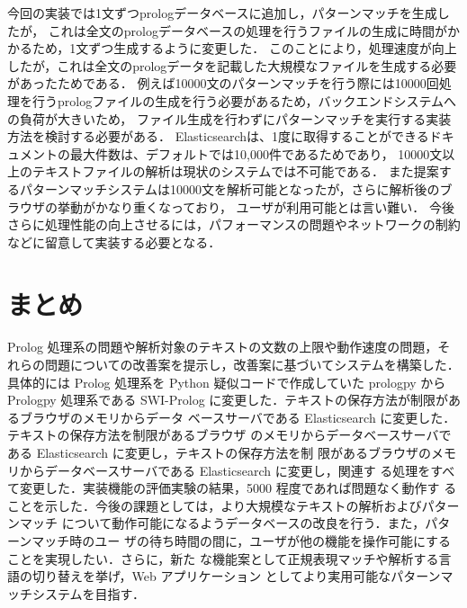 \documentclass{FITpaper}
\begin{document}
  
  今回の実装では1文ずつprologデータベースに追加し，パターンマッチを生成したが，
  これは全文のprologデータベースの処理を行うファイルの生成に時間がかかるため，1文ずつ生成するように変更した．
  このことにより，処理速度が向上したが，これは全文のprologデータを記載した大規模なファイルを生成する必要があったためである．
  例えば10000文のパターンマッチを行う際には10000回処理を行うprologファイルの生成を行う必要があるため，バックエンドシステムへの負荷が大きいため，
  ファイル生成を行わずにパターンマッチを実行する実装方法を検討する必要がある．
  Elasticsearchは、1度に取得することができるドキュメントの最大件数は、デフォルトでは10,000件であるためであり，
  10000文以上のテキストファイルの解析は現状のシステムでは不可能である．
  また提案するパターンマッチシステムは10000文を解析可能となったが，さらに解析後のブラウザの挙動がかなり重くなっており，
  ユーザが利用可能とは言い難い．
  今後さらに処理性能の向上させるには，パフォーマンスの問題やネットワークの制約などに留意して実装する必要となる．
  

\section{まとめ}
Prolog 処理系の問題や解析対象のテキストの文数の上限や動作速度の問題，そ
れらの問題についての改善案を提示し，改善案に基づいてシステムを構築した．具体的には
Prolog 処理系を Python 疑似コードで作成していた prologpy から Prologpy 処理系である
SWI-Prolog に変更した．テキストの保存方法が制限があるブラウザのメモリからデータ
ベースサーバである Elasticsearch に変更した．テキストの保存方法を制限があるブラウザ
のメモリからデータベースサーバである Elasticsearch に変更し，テキストの保存方法を制
限があるブラウザのメモリからデータベースサーバである Elasticsearch に変更し，関連す
る処理をすべて変更した．実装機能の評価実験の結果，5000 程度であれば問題なく動作す
ることを示した．今後の課題としては，より大規模なテキストの解析およびパターンマッチ
について動作可能になるようデータベースの改良を行う．また，パターンマッチ時のユー
ザの待ち時間の間に，ユーザが他の機能を操作可能にすることを実現したい．さらに，新た
な機能案として正規表現マッチや解析する言語の切り替えを挙げ，Web アプリケーション
としてより実用可能なパターンマッチシステムを目指す．

%

%
\end{document}
